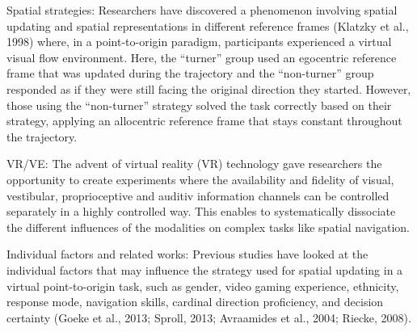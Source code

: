 \documentclass{frontiersSCNS} %
\begin{document}
Spatial strategies: Researchers have discovered a phenomenon involving spatial updating and spatial representations in different reference frames (Klatzky et al., 1998) where, in a point-to-origin paradigm, participants experienced a virtual visual flow environment. Here, the “turner” group used an egocentric reference frame that was updated during the trajectory and the “non-turner” group responded as if they were still facing the original direction they started. However, those using the “non-turner” strategy solved the task correctly based on their strategy, applying an allocentric reference frame that stays constant throughout the trajectory.

VR/VE: The advent of virtual reality (VR) technology gave researchers the opportunity to create experiments where the availability and fidelity of visual, vestibular, proprioceptive and auditiv information channels can be controlled separately in a highly controlled way. This enables to systematically dissociate the different influences of the modalities on complex tasks like spatial navigation.

Individual factors and related works: Previous studies have looked at the individual factors that may influence the strategy used for spatial updating in a virtual point-to-origin task, such as gender, video gaming experience, ethnicity, response mode, navigation skills, cardinal direction proficiency, and decision certainty (Goeke et al., 2013; Sproll, 2013; Avraamides et al., 2004; Riecke, 2008). 
\end{document}

